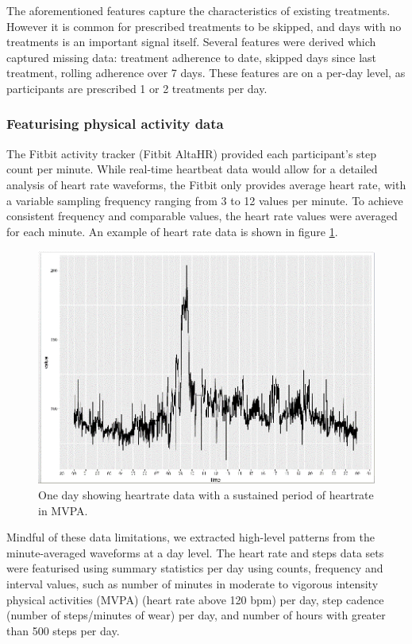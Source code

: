 \documentclass{article}
\begin{document}
The aforementioned features capture the characteristics of existing treatments. However it is common for prescribed treatments to be skipped, and days with no treatments is an important signal itself. Several features were derived which captured missing data: treatment adherence to date, skipped days since last treatment, rolling adherence over 7 days. These features are on a per-day level, as participants are prescribed 1 or 2 treatments per day. 


\subsubsection{Featurising physical activity data}
The Fitbit activity tracker (Fitbit AltaHR) provided each participant’s step count per minute. While real-time heartbeat data would allow for a detailed analysis of heart rate waveforms, the Fitbit only provides average heart rate, with a variable sampling frequency ranging from 3 to 12 values per minute. To achieve consistent frequency and comparable values, the heart rate values were averaged for each minute. An example of heart rate data is shown in figure \ref{fig:HR}.

\begin{figure}[htb]
  \includegraphics[width=\textwidth]{HR.png}
  \centering
   \caption{One day showing heartrate data with a sustained period of heartrate in MVPA.}
  \label{fig:HR}
\end{figure}

Mindful of these data limitations, we extracted high-level patterns from the minute-averaged waveforms at a day level. The heart rate and steps data sets were featurised using summary statistics per day using counts, frequency and interval values, such as number of minutes in moderate to vigorous intensity physical activities (MVPA) (heart rate above 120 bpm) per day, step cadence (number of steps/minutes of wear) per day, and number of hours with greater than 500 steps per day. 
\end{document}
